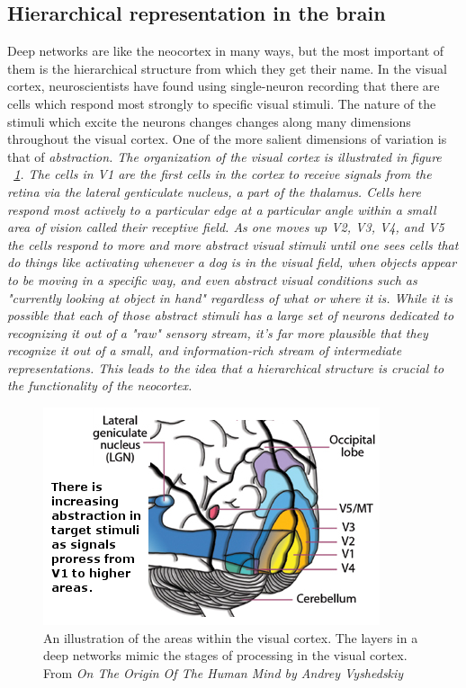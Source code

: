 \documentclass[12pt]{article}
\begin{document}
\begin{doublespacing}
	\subsection{Hierarchical representation in the brain}
		Deep networks are like the neocortex in many ways, but the most important of them is the hierarchical structure from which they get their name. In the visual cortex, neuroscientists have found using single-neuron recording that there are cells which respond most strongly to specific visual stimuli. The nature of the stimuli which excite the neurons changes changes along many dimensions throughout the visual cortex. One of the more salient dimensions of variation is that of \em abstraction\em\cite{hinton2005kind}. The organization of the visual cortex is illustrated in figure ~\ref{fig:visualcortex}. The cells in V1 are the first cells in the cortex to receive signals from the retina via the lateral genticulate nucleus, a part of the thalamus. Cells here respond most actively to a particular edge at a particular angle within a small area of vision called their receptive field. As one moves up V2, V3, V4, and V5 the cells respond to more and more abstract visual stimuli until one sees cells that do things like activating whenever a dog is in the visual field, when objects appear to be moving in a specific way, and even abstract visual conditions such as "currently looking at object in hand" regardless of what or where it is. While it is possible that each of those abstract stimuli has a large set of neurons dedicated to recognizing it out of a "raw" sensory stream, it's far more plausible that they recognize it out of a small, and information-rich stream of intermediate representations. This leads to the idea that a hierarchical structure is crucial to the functionality of the neocortex.
		
\begin{figure}[p]
\centering
\includegraphics[scale=0.8]{visual_cortex}
\caption{An illustration of the areas within the visual cortex. The layers in a deep networks mimic the stages of processing in the visual cortex. From \em On The Origin Of The Human Mind \em by Andrey Vyshedskiy \cite{vyshedskiy2008origin}}
\label{fig:visualcortex}
\end{figure}
		

\end{doublespacing}
\end{document}
